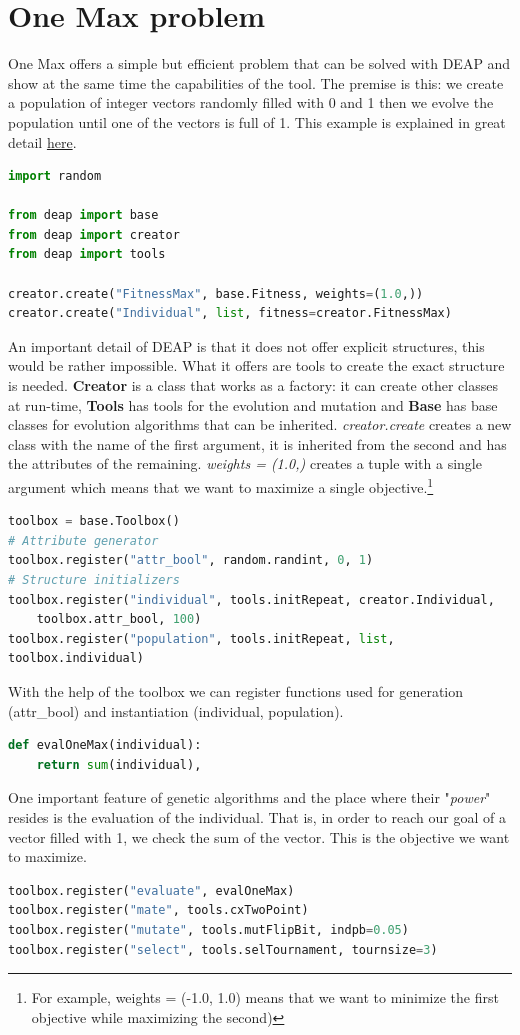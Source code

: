 \documentclass[a4paper,12pt]{report}
\begin{document}
\section {One Max problem}
One Max offers a simple but efficient problem that can be solved with DEAP and show at the same time the capabilities of the tool. The premise is this: we create a population of integer vectors randomly filled with 0 and 1 then we evolve the population until one of the vectors is full of 1. This example is explained in great detail \href {https://deap.readthedocs.io/en/master/examples/ga_onemax.html}{here}.
\begin{lstlisting}[language=Python]
import random

from deap import base
from deap import creator
from deap import tools

creator.create("FitnessMax", base.Fitness, weights=(1.0,))
creator.create("Individual", list, fitness=creator.FitnessMax)
\end{lstlisting}
An important detail of DEAP is that it does not offer explicit structures, this would be rather impossible. What it offers are tools to create the exact structure is needed. \textbf{Creator} is a class that works as a factory: it can create other classes at run-time, \textbf{Tools} has tools for the evolution and mutation and \textbf{Base} has base classes for evolution algorithms that can be inherited. \textit {creator.create} creates a new class with the name of the first argument, it is inherited from the second and has the attributes of the remaining.  \textit {weights = (1.0,)} creates a tuple with a single argument which means that we want to maximize a single objective.\footnote{For example, weights = (-1.0, 1.0) means that we want to minimize the first objective while maximizing the second)}
\begin{lstlisting}[language=Python]
toolbox = base.Toolbox()
# Attribute generator 
toolbox.register("attr_bool", random.randint, 0, 1)
# Structure initializers
toolbox.register("individual", tools.initRepeat, creator.Individual, 
    toolbox.attr_bool, 100)
toolbox.register("population", tools.initRepeat, list, 
toolbox.individual)
\end{lstlisting}
With the help of the toolbox we can register functions used for generation (attr\_bool) and instantiation (individual, population).
\begin{lstlisting}[language=Python]
def evalOneMax(individual):
    return sum(individual),
\end{lstlisting}
One important feature of genetic algorithms and the place where their "\textit{power}" resides is the evaluation of the individual. That is, in order to reach our goal of a vector filled with 1, we check the sum of the vector. This is the objective we want to maximize.
\begin{lstlisting}[language=Python]
toolbox.register("evaluate", evalOneMax)
toolbox.register("mate", tools.cxTwoPoint)
toolbox.register("mutate", tools.mutFlipBit, indpb=0.05)
toolbox.register("select", tools.selTournament, tournsize=3)
\end{lstlisting}
\end{document}
